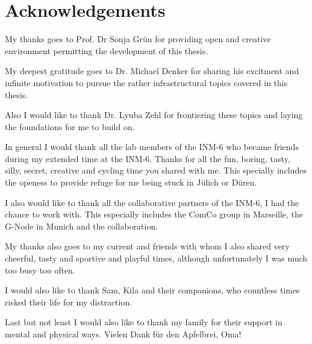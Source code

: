 \clearpage
{}

\chapter*{Acknowledgements}

My thanks goes to Prof. Dr Sonja Grün for providing open and creative environment permitting the development of this thesis.\newline

My deepest gratitude goes to Dr. Michael Denker for sharing his excitment and infinite motivation to pursue the rather infrastructural topics covered in this thesis.\newline

Also I would like to thank Dr. Lyuba Zehl for frontiering these topics and laying the foundations for me to build on.\newline

In general I would thank all the lab members of the INM-6 who became friends during my extended time at the INM-6. Thanks for all the fun, boring, tasty, silly, secret, creative and cycling time you shared with me. This specially includes the openess to provide refuge for me being stuck in Jülich or Düren.\newline

I also would like to thank all the collaborative partners of the INM-6, I had the chance to work with. This especially includes the ComCo group in Marseille, the G-Node in Munich and the  collaboration.\newline

My thanks also goes to my current and friends with whom I also shared very cheerful, tasty and sportive and playful times, although unfortunately I was much too busy too often.\newline

I would also like to thank Sam, Kila and their companions, who countless times risked their life for my distraction.
\newline

Last but not least I would also like to thank my family for their support in mental and physical ways. Vielen Dank für den Apfelbrei, Oma!\newline
